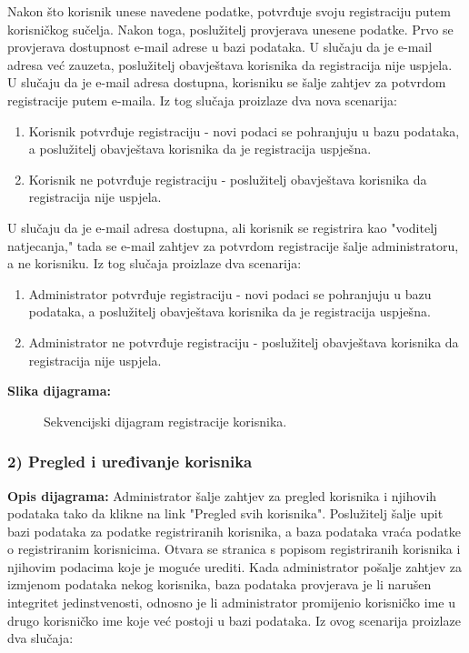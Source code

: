 				Nakon što korisnik unese navedene podatke, potvrđuje svoju registraciju putem korisničkog sučelja. Nakon toga, poslužitelj provjerava unesene podatke. Prvo se provjerava dostupnost e-mail adrese u bazi podataka. U slučaju da je e-mail adresa već zauzeta, poslužitelj obavještava korisnika da registracija nije uspjela. U slučaju da je e-mail adresa dostupna, korisniku se šalje zahtjev za potvrdom registracije putem e-maila. Iz tog slučaja proizlaze dva nova scenarija:
				
				\begin{enumerate}
					\item Korisnik potvrđuje registraciju - novi podaci se pohranjuju u bazu podataka, a poslužitelj obavještava korisnika da je registracija uspješna.
					\item Korisnik ne potvrđuje registraciju - poslužitelj obavještava korisnika da registracija nije uspjela.
				\end{enumerate}
				
				U slučaju da je e-mail adresa dostupna, ali korisnik se registrira kao "voditelj natjecanja," tada se e-mail zahtjev za potvrdom registracije šalje administratoru, a ne korisniku. Iz tog slučaja proizlaze dva scenarija:
				
				\begin{enumerate}
					\item Administrator potvrđuje registraciju - novi podaci se pohranjuju u bazu podataka, a poslužitelj obavještava korisnika da je registracija uspješna.
					\item Administrator ne potvrđuje registraciju - poslužitelj obavještava korisnika da registracija nije uspjela.
				\end{enumerate}
				
				\textbf{Slika dijagrama:}
				\begin{figure}[H]
					\centering

					\caption{Sekvencijski dijagram registracije korisnika.}
				\end{figure}
				
				\subsubsection{2) Pregled i uređivanje korisnika}
				
				\textbf{Opis dijagrama:}
				Administrator šalje zahtjev za pregled korisnika i njihovih podataka tako da klikne na link "Pregled svih korisnika". Poslužitelj šalje upit bazi podataka za podatke registriranih korisnika, a baza podataka vraća podatke o registriranim korisnicima. Otvara se stranica s popisom registriranih korisnika i njihovim podacima koje je moguće urediti. Kada administrator pošalje zahtjev za izmjenom podataka nekog korisnika, baza podataka provjerava je li narušen integritet jedinstvenosti, odnosno je li administrator promijenio korisničko ime u drugo korisničko ime koje već postoji u bazi podataka. Iz ovog scenarija proizlaze dva slučaja:
				
